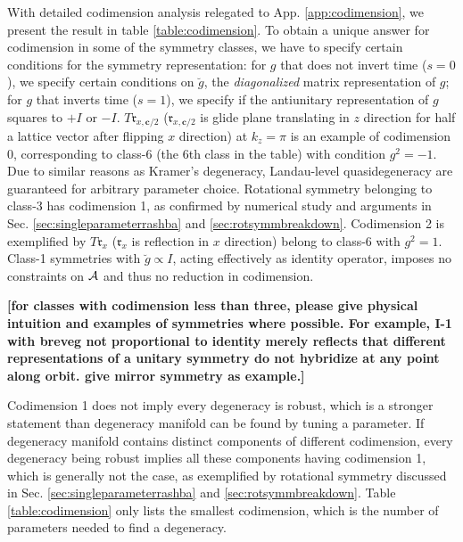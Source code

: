 \documentclass[aps, prb, showpacs, twocolumn, notitlepage, superscriptaddress]{revtex4-1}
\begin{document}
With detailed codimension analysis relegated to App. \ref{app:codimension}, we present the result in table \ref{table:codimension}. To obtain a unique answer for codimension in some of the symmetry classes, we have to specify certain conditions for the symmetry representation: for $g$ that does not invert time ($s{=}0$), we specify certain conditions on  $\breve{g}$, the \emph{diagonalized} matrix representation  of $g$; for $g$ that inverts time  ($s{=}1$), we specify if the antiunitary representation of $g$ squares to $+I$ or $-I$.   $T\mathfrak{r}_{x,\boldsymbol{c}/2}$ ($\mathfrak{r}_{x,\boldsymbol{c}/2}$ is glide plane translating in $z$ direction for half a lattice vector after flipping $x$ direction) at $k_z=\pi$ is an example of codimension 0, corresponding to class-6 (the 6th class in the table)  with condition $g^2=-1$. Due to similar reasons as Kramer's degeneracy, Landau-level quasidegeneracy are guaranteed for arbitrary parameter choice. Rotational symmetry belonging to class-3 has codimension 1, as confirmed by numerical study and arguments in Sec. \ref{sec:singleparameterrashba} and \ref{sec:rotsymmbreakdown}. Codimension 2 is exemplified by $T\mathfrak{r}_x$ ($\mathfrak{r}_x$ is reflection in $x$ direction) belong to class-6 with $g^2=1$. Class-1 symmetries with $\breve{g}\propto I$, acting effectively as identity operator, imposes no constraints on ${\cal A}$ and thus no reduction in codimension.


\textbf{[for classes with codimension less than three, please give physical intuition and examples of symmetries where possible. For example, I-1 with breveg not proportional to identity merely reflects that different representations of a unitary symmetry do not hybridize at any point along orbit. give mirror symmetry as example.]}

 Codimension 1 does not imply every degeneracy is robust, which is a stronger statement than degeneracy manifold can be found by tuning a parameter. If degeneracy manifold contains distinct components of different codimension, every degeneracy being robust implies all these components having codimension 1, which is generally not the case, as exemplified by rotational symmetry discussed in Sec. \ref{sec:singleparameterrashba} and \ref{sec:rotsymmbreakdown}. Table \ref{table:codimension} only lists the smallest codimension, which is the number of parameters needed to find a degeneracy. 
\end{document}
